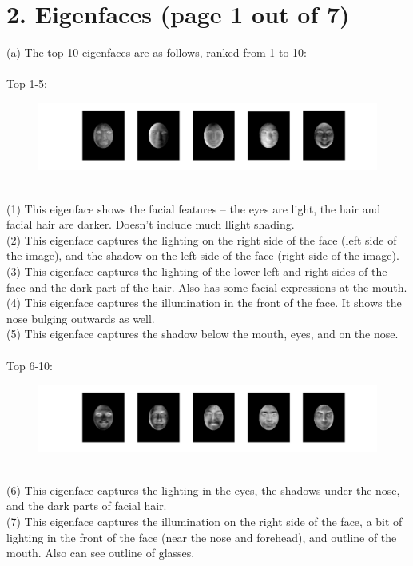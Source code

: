 \documentclass[11pt]{article}
\begin{document}
\section*{2. Eigenfaces (page 1 out of 7)}
(a) The top 10 eigenfaces are as follows, ranked from 1 to 10:
\\\\
Top 1-5:
\begin{figure}[ht!]
\centering
\includegraphics[width=180mm]{images/eigface5-1.png}
\label{overflow}
\end{figure}
\\
(1) This eigenface shows the facial features -- the eyes are light, the hair and facial hair are darker. Doesn't include much llight shading. \\
(2) This eigenface captures the lighting on the right side of the face (left side of the image), and the shadow on the left side of the face (right side of the image). \\
(3) This eigenface captures the lighting of the lower left and right sides of the face and the dark part of the hair. Also has some facial expressions at the mouth. \\
(4) This eigenface captures the illumination in the front of the face. It shows the nose bulging outwards as well. \\
(5) This eigenface captures the shadow below the mouth, eyes, and on the nose.
\\\\
Top 6-10:
\begin{figure}[ht!]
\centering
\includegraphics[width=180mm]{images/eigface5-2.png}
\label{overflow}
\end{figure}
\\
(6) This eigenface captures the lighting in the eyes, the shadows under the nose, and the dark parts of facial hair. \\
(7) This eigenface captures the illumination on the right side of the face, a bit of lighting in the front of the face (near the nose and forehead), and outline of the mouth. Also can see outline of glasses. \\
\end{document}
